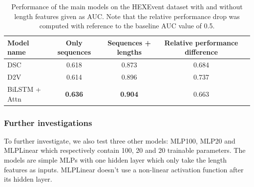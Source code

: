 \begin{table}[h!]
	\centering
	\begin{tabular}{| l | c | c | c| c} 
		\hline
		Model name & Only sequences & Sequences + lengths & Relative performance difference\\
		\hline
		DSC & 0.618 & 0.873 & 0.684\\
		D2V & 0.614 & 0.896 & 0.737\\
		BiLSTM + Attn & \textbf{0.636} & \textbf{0.904} & 0.663\\
		\hline
	\end{tabular}
	\caption{Performance of the main models on the HEXEvent dataset with and without length features given as AUC. Note that the relative performance drop was computed with reference to the baseline AUC value of 0.5.
	}
	\label{table:results_hexevent}
\end{table}

\subsubsection{Further investigations}
To further investigate, we also test three other models: MLP100, MLP20 and MLPLinear which respectively contain 100, 20 and 20 trainable parameters. The models are simple MLPs with one hidden layer which only take the length features as inputs. MLPLinear doesn't use a non-linear activation function after its hidden layer.


